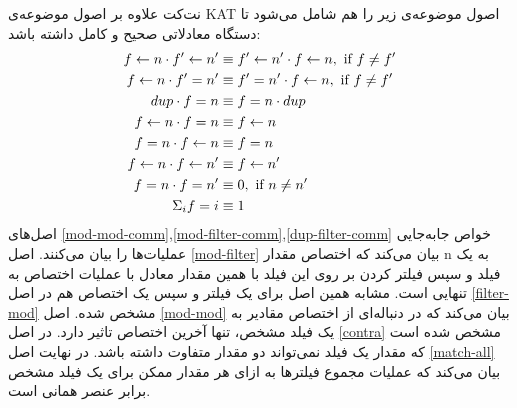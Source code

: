نت‌کت علاوه بر اصول موضوعه‌ی%
KAT
اصول‌ موضوعه‌ی زیر را هم شامل می‌شود تا دستگاه معادلاتی صحیح و کامل%
داشته باشد:
\begin{align}
    f \leftarrow n \cdot f' \leftarrow n' & \equiv f' \leftarrow n' \cdot f \leftarrow n,
    \text{ if } f \neq f' \label{mod-mod-comm}
    \\
    f \leftarrow n \cdot f' = n'   & \equiv f' = n' \cdot f \leftarrow n,
    \text{ if } f \neq f' \label{mod-filter-comm}                            \\
    dup \cdot f = n         & \equiv f = n \cdot dup \label{dup-filter-comm} \\
    f \leftarrow n \cdot f = n     & \equiv f \leftarrow n \label{mod-filter}              \\
    f = n \cdot f \leftarrow n     & \equiv f = n \label{filter-mod}                \\
    f \leftarrow n \cdot f \leftarrow n'  & \equiv f \leftarrow n' \label{mod-mod}                \\
    f = n \cdot f = n'      & \equiv 0, \text{ if } n \neq n' \label{contra} \\
    \Sigma_{i} f = i        & \equiv 1 \label{match-all}
\end{align}
اصل‌های
\ref{mod-mod-comm},\ref{mod-filter-comm},\ref{dup-filter-comm}
خواص جابه‌جایی%
عملیات‌ها را بیان می‌کنند.
اصل
\ref{mod-filter}
بیان می‌کند که اختصاص مقدار
n
به یک فیلد و سپس  فیلتر کردن بر روی این فیلد با همین مقدار معادل با عملیات اختصاص%
به تنهایی است.
مشابه همین اصل برای یک فیلتر و سپس یک اختصاص هم در اصل
\ref{filter-mod}
مشخص شده.
اصل
\ref{mod-mod}
بیان می‌کند که در دنباله‌ای از اختصاص مقادیر به یک فیلد مشخص، تنها آخرین اختصاص تاثیر دارد.
در اصل
\ref{contra}
مشخص شده است که مقدار یک فیلد نمی‌تواند دو مقدار متفاوت داشته باشد.
در نهایت اصل
\ref{match-all}
بیان می‌کند که عملیات مجموع فیلتر‌ها به ازای هر مقدار ممکن برای یک فیلد مشخص برابر عنصر همانی%
است.

